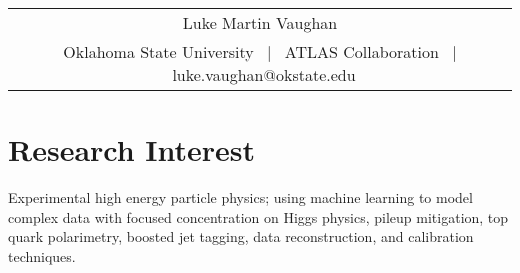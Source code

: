 \documentclass[a4paper,12pt]{article}
\begin{document}
\pagestyle{empty} 



\begin{tabularx}{\linewidth}{@{} C @{}}
\Huge{Luke Martin Vaughan} \\[7.5pt]
Oklahoma State University \ $|$ \
ATLAS Collaboration \ $|$ \
luke.vaughan@okstate.edu \\
\end{tabularx}

\section{Research Interest}
Experimental high energy particle physics; using machine learning to model complex data with focused
concentration on Higgs physics, pileup mitigation, top quark polarimetry, boosted jet tagging, data
reconstruction, and calibration techniques.

\end{document}

